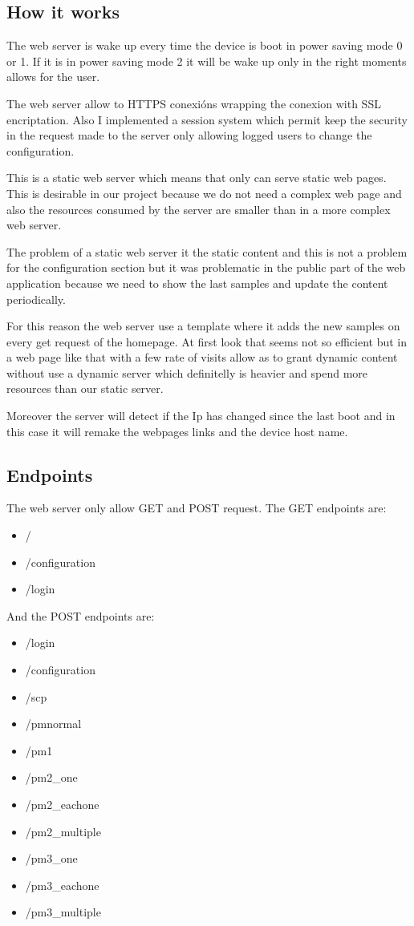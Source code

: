 		\subsection{How it works}
		The web server is wake up every time the device is boot in power saving mode 0 or 1. If it is in power saving mode 2 it will be wake up only in the right moments allows for the user.

		The web server allow to HTTPS conexións wrapping the conexion with SSL encriptation. Also I implemented a session system which permit keep the security in the request made to the server only allowing logged users to change the configuration.

		This is a static web server which means that only can serve static web pages. This is desirable in our project because we do not need a complex web page and also the resources consumed by the server are smaller than in a more complex web server.

		The problem of a static web server it the static content and this is not a problem for the configuration section but it was problematic in the public part of the web application because we need to show the last samples and update the content periodically.

		For this reason the web server use a template where it adds the new samples on every get request of the homepage. At first look that seems not so efficient but in a web page like that with a few rate of visits allow as to grant dynamic content without use a dynamic server which definitelly is heavier and spend more resources than our static server.

		Moreover the server will detect if the Ip has changed since the last boot and in this case it will remake the webpages links and the device host name. %

		\subsection{Endpoints}
		The web server only allow GET and POST request.
		The GET endpoints are:
		\begin{itemize}
			\item /
			\item /configuration
			\item /login
		\end{itemize}
		And the POST endpoints are:
		\begin{itemize}
			\item /login
			\item /configuration
			\item /scp
			\item /pmnormal
			\item /pm1
			\item /pm2\_one
			\item /pm2\_eachone
			\item /pm2\_multiple
			\item /pm3\_one
			\item /pm3\_eachone
			\item /pm3\_multiple
		\end{itemize}


